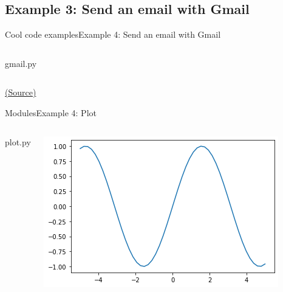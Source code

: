\documentclass[10pt,compress]{beamer} %
\begin{document}
\subsection{Example 3: Send an email with Gmail}
\begin{frame}{Cool code examples}{Example 4: Send an email with Gmail}
	\begin{columns}
		\vspace{-0.2cm}
		\begin{block}{gmail.py}
		\vspace{-0.2cm}
		
		\end{block}
	\end{columns}

	\centering \tiny{\href{http://www.pythonforbeginners.com/code-snippets-source-code/using-python-to-send-email/}{(Source)}}
\end{frame}

\begin{frame}{Modules}{Example 4: Plot}
	\begin{columns}
 	   \column{.60\textwidth}

		\vspace{-0.2cm}
		\begin{exampleblock}{plot.py}
		\vspace{-0.2cm}
		
		\vspace{-0.2cm}
		\end{exampleblock}

  		\column{.50\textwidth}
		\vspace{-0.2cm}
		\centering \includegraphics[width=\linewidth]{figs/plot.png}\\
	\end{columns}
		\vspace{-0.2cm}
\end{frame}
\end{document}
